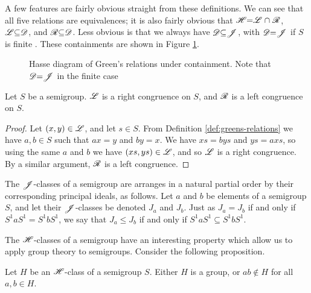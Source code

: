 A few features are fairly obvious straight from these definitions.  We can see
that all five relations are equivalences; it is also fairly obvious that
$\mathrel{\mathscr{H}} = \mathrel{\mathscr{L}} \cap \mathrel{\mathscr{R}}$, $\mathrel{\mathscr{L}} \subseteq \mathrel{\mathscr{D}}$, and $\mathrel{\mathscr{R}} \subseteq \mathrel{\mathscr{D}}$.  Less
obvious is that we always have $\mathrel{\mathscr{D}} \subseteq \mathrel{\mathscr{J}}$, with $\mathrel{\mathscr{D}} = \mathrel{\mathscr{J}}$ if $S$ is
finite \cite[\S2.1]{howie}.  These containments are shown in Figure
\ref{fig:greens-containment}.

\begin{figure}[h]
  \centering
  \caption[Hasse diagram of Green's relations under containment]{Hasse diagram
    of Green's relations under containment.  Note that $\mathrel{\mathscr{D}} = \mathrel{\mathscr{J}}$ in the finite
    case}
  \label{fig:greens-containment}
\end{figure}

\begin{proposition}
  \label{prop:greens-as-congs}
  Let $S$ be a semigroup.  $\mathrel{\mathscr{L}}$ is a right congruence on $S$, and $\mathrel{\mathscr{R}}$ is a
  left congruence on $S$.
  \begin{proof}
    Let $(x,y) \in \mathscr{L}$, and let $s \in S$.  From Definition
    \ref{def:greens-relations} we have $a,b \in S$ such that $ax=y$ and $by=x$.
    We have $xs = bys$ and $ys = axs$, so using the same $a$ and $b$ we have
    $(xs,ys) \in \mathscr{L}$, and so $\mathrel{\mathscr{L}}$ is a right congruence.  By a similar
    argument, $\mathrel{\mathscr{R}}$ is a left congruence.
  \end{proof}
\end{proposition}

The $\mathrel{\mathscr{J}}$-classes of a semigroup are arranges in a natural partial order by
their corresponding principal ideals, as follows.  Let $a$ and $b$ be elements
of a semigroup $S$, and let their $\mathrel{\mathscr{J}}$-classes be denoted $J_a$ and $J_b$.
Just as $J_a = J_b$ if and only if $S^1aS^1 = S^1bS^1$, we say that
$J_a \leq J_b$ if and only if $S^1aS^1 \subseteq S^1bS^1$.

The $\mathrel{\mathscr{H}}$-classes of a semigroup have an interesting property which allow us to
apply group theory to semigroups.  Consider the following proposition.

\begin{proposition}
  \label{prop:group-h-class}
  Let $H$ be an $\mathrel{\mathscr{H}}$-class of a semigroup $S$.  Either $H$ is a group, or
  $ab \notin H$ for all $a,b \in H$.
\end{proposition}

